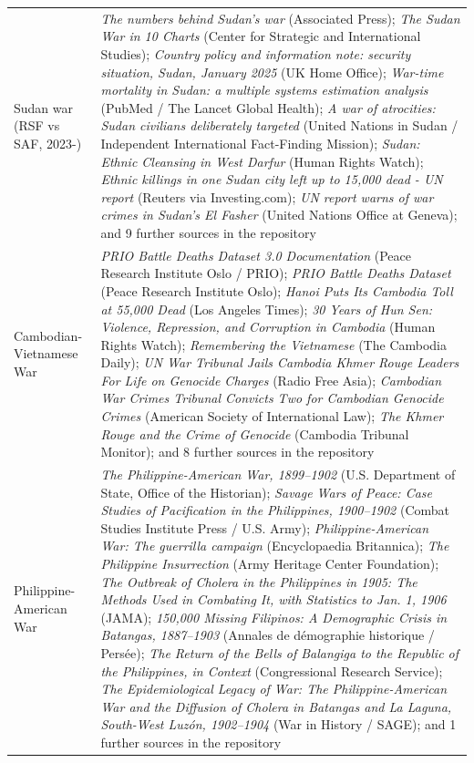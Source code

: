 \documentclass[11pt]{article}
\begin{document}
\begin{scriptsize}
\begin{longtable}{p{3.5cm} p{12.5cm}}
\addlinespace
Sudan war (RSF vs SAF, 2023-) & \emph{The numbers behind Sudan's war} (Associated Press); \emph{The Sudan War in 10 Charts} (Center for Strategic and International Studies); \emph{Country policy and information note: security situation, Sudan, January 2025} (UK Home Office); \emph{War-time mortality in Sudan: a multiple systems estimation analysis} (PubMed / The Lancet Global Health); \emph{A war of atrocities: Sudan civilians deliberately targeted} (United Nations in Sudan / Independent International Fact-Finding Mission); \emph{Sudan: Ethnic Cleansing in West Darfur} (Human Rights Watch); \emph{Ethnic killings in one Sudan city left up to 15,000 dead - UN report} (Reuters via Investing.com); \emph{UN report warns of war crimes in Sudan's El Fasher} (United Nations Office at Geneva); and 9 further sources in the repository \\
\addlinespace
Cambodian-Vietnamese War & \emph{PRIO Battle Deaths Dataset 3.0 Documentation} (Peace Research Institute Oslo / PRIO); \emph{PRIO Battle Deaths Dataset} (Peace Research Institute Oslo); \emph{Hanoi Puts Its Cambodia Toll at 55,000 Dead} (Los Angeles Times); \emph{30 Years of Hun Sen: Violence, Repression, and Corruption in Cambodia} (Human Rights Watch); \emph{Remembering the Vietnamese} (The Cambodia Daily); \emph{UN War Tribunal Jails Cambodia Khmer Rouge Leaders For Life on Genocide Charges} (Radio Free Asia); \emph{Cambodian War Crimes Tribunal Convicts Two for Cambodian Genocide Crimes} (American Society of International Law); \emph{The Khmer Rouge and the Crime of Genocide} (Cambodia Tribunal Monitor); and 8 further sources in the repository \\
\addlinespace
Philippine-American War & \emph{The Philippine-American War, 1899–1902} (U.S. Department of State, Office of the Historian); \emph{Savage Wars of Peace: Case Studies of Pacification in the Philippines, 1900–1902} (Combat Studies Institute Press / U.S. Army); \emph{Philippine-American War: The guerrilla campaign} (Encyclopaedia Britannica); \emph{The Philippine Insurrection} (Army Heritage Center Foundation); \emph{The Outbreak of Cholera in the Philippines in 1905: The Methods Used in Combating It, with Statistics to Jan. 1, 1906} (JAMA); \emph{150,000 Missing Filipinos: A Demographic Crisis in Batangas, 1887–1903} (Annales de démographie historique / Persée); \emph{The Return of the Bells of Balangiga to the Republic of the Philippines, in Context} (Congressional Research Service); \emph{The Epidemiological Legacy of War: The Philippine-American War and the Diffusion of Cholera in Batangas and La Laguna, South-West Luzón, 1902–1904} (War in History / SAGE); and 1 further sources in the repository \\

\end{longtable}
\end{scriptsize}
\end{document}

